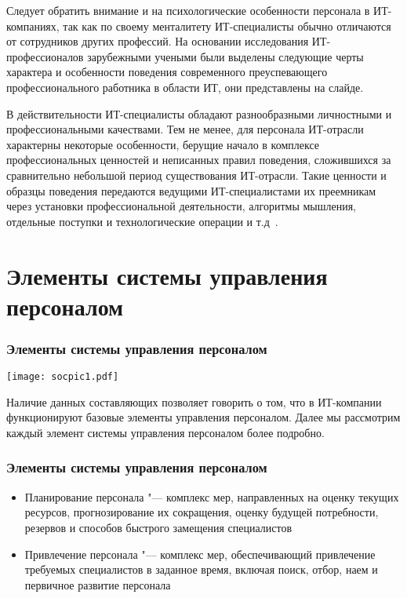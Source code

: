 \documentclass{../industrial-development}
\begin{document}
	Следует обратить внимание и на психологические особенности персонала в ИТ-компаниях, так как по своему менталитету ИТ-специалисты обычно отличаются от сотрудников других профессий. На основании исследования ИТ-профессионалов зарубежными учеными были выделены следующие черты характера и особенности поведения современного преуспевающего профессионального работника в области ИТ, они представлены на слайде.
	
	В действительности ИТ-специалисты обладают разнообразными личностными и профессиональными качествами. Тем не менее, для персонала ИТ-отрасли характерны некоторые особенности, берущие начало в комплексе профессиональных ценностей и неписанных правил поведения, сложившихся за сравнительно небольшой период существования ИТ-отрасли. Такие ценности и образцы поведения передаются ведущими ИТ-специалистами их преемникам через установки профессиональной деятельности, алгоритмы мышления, отдельные поступки и технологические операции и т.д~\cite{OsobenPoveden}. 
	
	\section{Элементы системы управления персоналом}
	\begin{frame} \frametitle{Элементы системы управления персоналом}
		
		\centerline{\texttt{[image: socpic1.pdf]}}
		
	\end{frame}
	
	\lecturenotes
	
	Наличие данных составляющих позволяет говорить о том, что в ИТ-компании функционируют базовые элементы управления персоналом. Далее мы рассмотрим каждый элемент системы управления персоналом более подробно.
	
	\begin{frame} \frametitle{Элементы системы управления персоналом}
		
		\begin{itemize}
			\item Планирование персонала "--- комплекс мер, направленных на оценку текущих ресурсов, прогнозирование их сокращения, оценку будущей потребности, резервов и способов быстрого замещения специалистов
			\item Привлечение персонала "--- комплекс мер, обеспечивающий привлечение требуемых специалистов в заданное время, включая поиск, отбор, наем и первичное развитие персонала
		\end{itemize}
	\end{frame}
	
\end{document}
